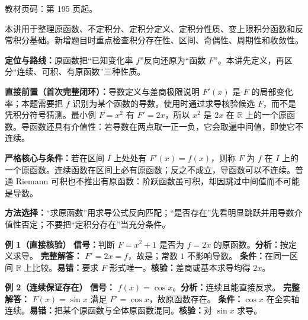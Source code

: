 
\begin{knowledgeBox}
教材页码：第 195 页起。

本讲用于整理原函数、不定积分、定积分定义、定积分性质、变上限积分函数和反常积分基础。新增题目时重点检查积分存在性、区间、奇偶性、周期性和收敛性。
\end{knowledgeBox}


\par

\begin{knowledgeBox}
\textbf{定位与路线：}原函数把“已知变化率 \(f\)”反向还原为“函数 \(F\)”。本讲先定义，再区分“连续、可积、有原函数”三种性质。

\textbf{直接前置（首次完整闭环）：}导数定义与差商极限说明 \(F'(x)\) 是 \(F\) 的局部变化率；本题需要把 \(f\) 识别为某个函数的导数。使用时通过求导核验候选 \(F\)，而不是凭积分符号猜测。最小例 \(F=x^2\) 有 \(F'=2x\)，所以 \(x^2\) 是 \(2x\) 在 \(\mathbb R\) 上的一个原函数。导函数还具有介值性：若导数在两点取一正一负，它会取遍中间值，即使它不连续。

\textbf{严格核心与条件：}若在区间 \(I\) 上处处有 \(F'(x)=f(x)\)，则称 \(F\) 为 \(f\) 在 \(I\) 上的一个原函数。连续函数在区间上必有原函数；反之不成立，导函数可以不连续。普通 Riemann 可积也不推出有原函数：阶跃函数虽可积，却因跳过中间值而不可能是导数。

\textbf{方法选择：}“求原函数”用求导公式反向匹配；“是否存在”先看明显跳跃并用导数介值性否定；不要把“定积分存在”当充分条件。

\textbf{例 1（直接核验）}\quad
\textbf{信号：}判断 \(F=x^2+1\) 是否为 \(f=2x\) 的原函数。\textbf{分析：}按定义求导。
\textbf{完整解答：} \(F'=2x=f\)，故是；常数 \(1\) 不影响导数。
\textbf{条件：}在同一区间 \(\mathbb R\) 上比较。\textbf{易错：}要求 \(F\) 形式唯一。\textbf{核验：}差商或基本求导均得 \(2x\)。

\textbf{例 2（连续保证存在）}\quad
\textbf{信号：} \(f(x)=\cos x\)。\textbf{分析：}连续且能直接反求。
\textbf{完整解答：} \(F(x)=\sin x\) 满足 \(F'=\cos x\)，故原函数存在。
\textbf{条件：}\(\cos x\) 在全实轴连续。\textbf{易错：}把某个原函数与全体原函数混同。\textbf{核验：}对 \(\sin x\) 求导。


\end{knowledgeBox}
